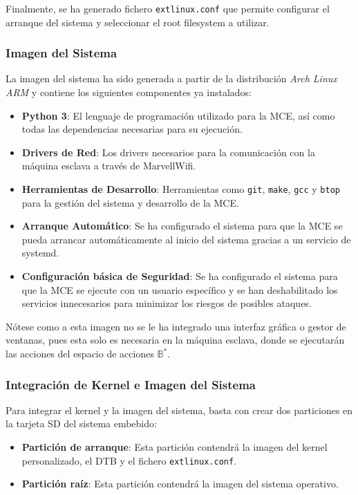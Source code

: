 Finalmente, se ha generado fichero \texttt{extlinux.conf} que permite
configurar el arranque del sistema y seleccionar el root filesystem
a utilizar.

\subsubsection{Imagen del Sistema}
La imagen del sistema ha sido generada a partir de la distribución
\emph{Arch Linux ARM} y contiene los siguientes componentes ya instalados:

\begin{itemize}
    \item \textbf{Python 3}: El lenguaje de programación utilizado para la MCE,
    así como todas las dependencias necesarias para su ejecución.
    \item \textbf{Drivers de Red}: Los drivers necesarios para la comunicación
    con la máquina esclava a través de MarvellWifi.
    \item \textbf{Herramientas de Desarrollo}: Herramientas como \texttt{git}, \texttt{make},
    \texttt{gcc} y \texttt{btop} para la gestión del sistema y desarrollo de la MCE.
    \item \textbf{Arranque Automático}: Se ha configurado el sistema para que la MCE se 
    pueda arrancar automáticamente al inicio del sistema gracias a un servicio de systemd.
    \item \textbf{Configuración básica de Seguridad}: Se ha configurado el sistema para 
    que la MCE se ejecute con un usuario específico y se han deshabilitado
    los servicios innecesarios para minimizar los riesgos de posibles ataques.
\end{itemize}

Nótese como a esta imagen no se le ha integrado una interfaz gráfica o gestor de ventanas, 
pues esta solo es necesaria en la máquina esclava, donde se ejecutarán las acciones del espacio 
de acciones \(\mathbb{B}^*\).

\subsubsection{Integración de Kernel e Imagen del Sistema}
Para integrar el kernel y la imagen del sistema, basta con crear
dos particiones en la tarjeta SD del sistema embebido:

\begin{itemize}
    \item \textbf{Partición de arranque}: Esta partición contendrá la imagen del kernel personalizado,
    el DTB y el fichero \texttt{extlinux.conf}.
    \item \textbf{Partición raíz}: Esta partición contendrá la imagen del
    sistema operativo.
\end{itemize}

